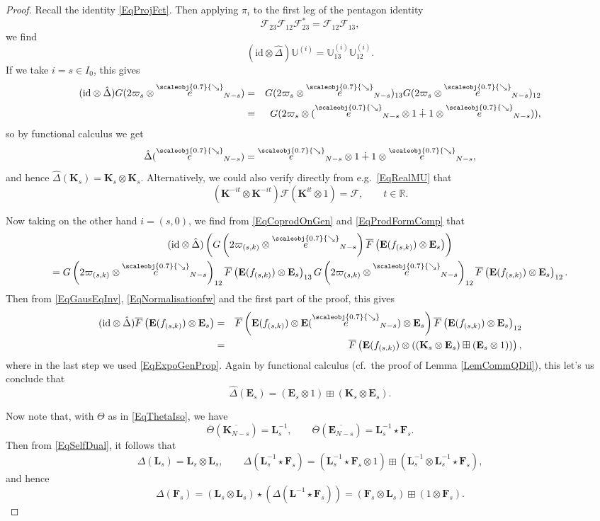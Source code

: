 \documentclass[11pt, reqno]{amsart}
\theoremstyle{definition}
\numberwithin{equation}{section}
\newcommand{\hr}[1]{\left(#1\right)}                                                    %
\def\R{\mathbb R}
\newcommand{\eb}{\mathbf{E}}
\newcommand{\Gauss}{G}
\newcommand{\bbU}{\mathbb{U}}
\newcommand{\Fct}{\mathcal{F}}
\newcommand{\sears}{\scaleobj{0.7}{\searrow}}
\newcommand{\seee}{\overset{\sears}{e}}
\newcommand{\id}{\mathrm{id}}
\newcommand{\Eb}{\mathbf{E}}
\newcommand{\Kb}{\mathbf{K}}
\newcommand{\Lb}{\mathbf{L}}
\def\stgE{\mathbf{E}}
\def\stgF{\mathbf{F}}
\begin{document}
\begin{proof}
Recall the identity \eqref{EqProjFct}. Then applying $\pi_{i}$ to the first leg of the pentagon identity 
\[
\Fct_{23}\Fct_{12}\Fct_{23}^* = 
\Fct_{12}\Fct_{13},
\]
we find 
\begin{equation}\label{EqCoprodOnGen}
(\id\otimes \hat{\Delta})\bbU^{(i)} = \bbU^{(i)}_{13}\bbU^{(i)}_{12}. 
\end{equation}
If we take $i = s \in I_0$, this gives 
\begin{eqnarray*}
(\id\otimes \hat{\Delta})\Gauss(2\varpi_s \otimes \seee_{N-s}) &=& \Gauss(2\varpi_s \otimes \seee_{N-s})_{13}\Gauss(2\varpi_s \otimes \seee_{N-s})_{12}\\
&=& \Gauss(2\varpi_s \otimes (\seee_{N-s}\otimes 1 \dotplus 1\otimes \seee_{N-s})),
\end{eqnarray*}
so by functional calculus we get 
\[
\hat{\Delta}(\seee_{N-s}) = \seee_{N-s}\otimes 1 \dotplus 1\otimes \seee_{N-s}, 
\]
and hence $\hat{\Delta}(\Kb_s) = \Kb_s \otimes \Kb_s$. Alternatively, we could also verify directly from e.g.\ \eqref{EqRealMU} that 
\[
(\Kb^{-it}\otimes \Kb^{-it})\Fct (\Kb^{it}\otimes 1)= \Fct,\qquad t\in \R. 
\]

Now taking on the other hand $i = (s,0)$, we find from \eqref{EqCoprodOnGen} and \eqref{EqProdFormComp} that 
\begin{multline*}
(\id\otimes \hat{\Delta})\left(\Gauss\left(2\varpi_{(s,k)} \otimes \seee_{N-s}\right)\overline{F}\hr{\eb(f_{(s,k)})\otimes  \stgE_s}\right) \\ = \Gauss\left(2\varpi_{(s,k)} \otimes \seee_{N-s}\right)_{12}\overline{F}\hr{\eb(f_{(s,k)})\otimes  \stgE_s}_{13}\Gauss\left(2\varpi_{(s,k)} \otimes \seee_{N-s}\right)_{12}\overline{F}\hr{\eb(f_{(s,k)})\otimes  \stgE_s}_{12}.
\end{multline*}
Then from \eqref{EqGausEqInv}, \eqref{EqNormalisationfw} and the first part of the proof, this gives 
\begin{eqnarray*}
(\id\otimes \hat{\Delta})\overline{F}\hr{\eb(f_{(s,k)})\otimes  \stgE_s}&=& \overline{F}\hr{\eb(f_{(s,k)})\otimes \Eb(\seee_{N-s})\otimes  \stgE_s} \overline{F}\hr{\eb(f_{(s,k)})\otimes  \stgE_s}_{12}\\
&=& \overline{F}\hr{\eb(f_{(s,k)})\otimes ((\Kb_s \otimes \stgE_s) \boxplus (\stgE_s \otimes 1))}, 
\end{eqnarray*}
where in the last step we used \eqref{EqExpoGenProp}.
Again by functional calculus (cf.\ the proof of Lemma \ref{LemCommQDil}), this let's us conclude that 
\[
\hat{\Delta}(\stgE_s) = (\stgE_s\otimes 1)\boxplus(\Kb_s\otimes \stgE_s).
\]

Now note that, with $\Theta$ as in \eqref{EqThetaIso}, we have 
\[
\overline{\Theta}(\overline{\Kb_{N-s}}) = \Lb_s^{-1},\qquad \overline{\Theta}(\overline{\stgE_{N-s}}) = \Lb_s^{-1}\star \stgF_s. 
\]
Then from \eqref{EqSelfDual}, it follows that 
\[
\Delta(\Lb_s) = \Lb_s \otimes \Lb_s,\qquad \Delta(\Lb_s^{-1} \star \stgF_s) = (\Lb_s^{-1}\star \stgF_s \otimes 1)\boxplus (\Lb_s^{-1}\otimes \Lb_s^{-1}\star \stgF_s),
\]
and hence 
\[
\Delta(\stgF_s) = (\Lb_s\otimes \Lb_s)\star (\Delta(\Lb^{-1}\star \stgF_s)) = (\stgF_s \otimes \Lb_s)\boxplus (1\otimes \stgF_s). 
\]
\end{proof}
\end{document}
